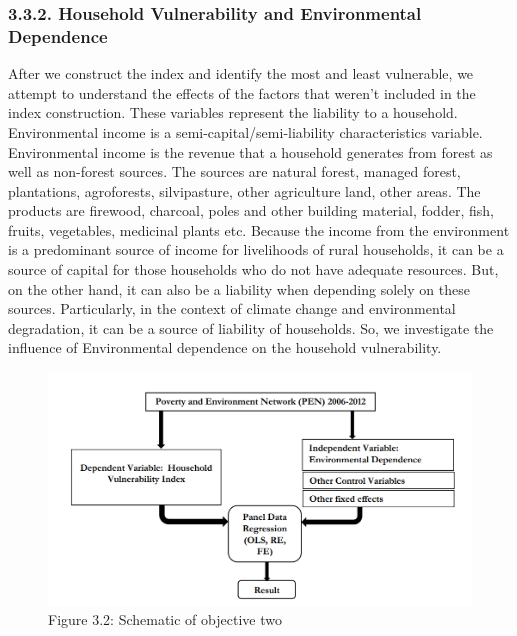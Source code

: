 \documentclass[12pt, a4paper]{article}
\begin{document}
\subsubsection{3.3.2. Household Vulnerability and Environmental Dependence}
\renewcommand{\thepage}{\arabic{page}}
After we construct the index and identify the most and least vulnerable, we attempt to understand the effects of the factors that weren't included in the index construction. These variables represent the liability to a household. Environmental income is a semi-capital/semi-liability characteristics variable. Environmental income is the revenue that a household generates from forest as well as non-forest sources. The sources are natural forest, managed forest, plantations, agroforests, silvipasture, other agriculture land, other areas. The products are firewood, charcoal, poles and other building material, fodder, fish, fruits, vegetables, medicinal plants etc. Because the income from the environment is a predominant source of income for livelihoods of rural households, it can be a source of capital for those households who do not have adequate resources. But, on the other hand, it can also be a liability when depending solely on these sources. Particularly, in the context of climate change and environmental degradation, it can be a source of liability of households. So, we investigate the influence of Environmental dependence on the household vulnerability. 
\begin{figure}[h]
\centering
\includegraphics[scale=0.9]{Objective 2.png}
\captionsetup{labelformat=empty}
\caption{Figure 3.2: Schematic of objective two} 
\label{fig:conceptualfw2}
\setlength{\abovecaptionskip}{4pt}
\end{figure}
\\
\\
\\
\\
\\
\\
\end{document}
